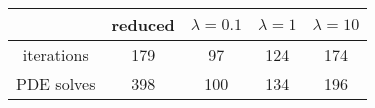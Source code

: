 \begin{tabular}{ccccc}
& reduced & $\lambda = 0.1$ & $\lambda = 1$ & $\lambda = 10$ \\
\hline
iterations & 179 & 97 & 124 & 174 \\
PDE solves & 398 & 100 & 134 & 196 \\
\hline
\end{tabular}
